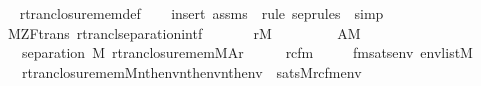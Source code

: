 \begin{isabellebody}
\ \ %
\endisadelimproof
%
\isatagproof
{}\isamarkupfalse%
\ rtran{\isacharunderscore}{\kern0pt}closure{\isacharunderscore}{\kern0pt}mem{\isacharunderscore}{\kern0pt}def\isanewline
\ \ \isamarkupfalse%
\ {\isacharparenleft}{\kern0pt}insert\ assms\ {\isacharsemicolon}{\kern0pt}\ {\isacharparenleft}{\kern0pt}rule\ sep{\isacharunderscore}{\kern0pt}rules\ {\isacharbar}{\kern0pt}\ simp{\isacharparenright}{\kern0pt}{\isacharplus}{\kern0pt}{\isacharparenright}{\kern0pt}%
\endisatagproof
{\isafoldproof}%
%
\isadelimproof
\isanewline
%
\endisadelimproof
\isanewline
\isanewline
{}\isamarkupfalse%
\ {\isacharparenleft}{\kern0pt}\ M{\isacharunderscore}{\kern0pt}ZF{\isacharunderscore}{\kern0pt}trans{\isacharparenright}{\kern0pt}\ rtrancl{\isacharunderscore}{\kern0pt}separation{\isacharunderscore}{\kern0pt}intf{\isacharcolon}{\kern0pt}\isanewline
\ \ \isanewline
\ \ \ \ {\isachardoublequoteopen}r{\isasymin}M{\isachardoublequoteclose}\isanewline
\ \ \ \ \isanewline
\ \ \ \ {\isachardoublequoteopen}A{\isasymin}M{\isachardoublequoteclose}\isanewline
\ \ \isanewline
\ \ \ \ {\isachardoublequoteopen}separation\ {\isacharparenleft}{\kern0pt}{\isacharhash}{\kern0pt}{\isacharhash}{\kern0pt}M{\isacharcomma}{\kern0pt}\ rtran{\isacharunderscore}{\kern0pt}closure{\isacharunderscore}{\kern0pt}mem{\isacharparenleft}{\kern0pt}{\isacharhash}{\kern0pt}{\isacharhash}{\kern0pt}M{\isacharcomma}{\kern0pt}A{\isacharcomma}{\kern0pt}r{\isacharparenright}{\kern0pt}{\isacharparenright}{\kern0pt}{\isachardoublequoteclose}\isanewline
%
\isadelimproof
%
\endisadelimproof
%
\isatagproof
{}\isamarkupfalse%
\ {\isacharminus}{\kern0pt}\isanewline
\ \ \isamarkupfalse%
\ rcfm\ \isanewline
\ \ \ \ fmsats{\isacharcolon}{\kern0pt}{\isachardoublequoteopen}{\isasymAnd}env{\isachardot}{\kern0pt}\ env{\isasymin}list{\isacharparenleft}{\kern0pt}M{\isacharparenright}{\kern0pt}\ {\isasymLongrightarrow}\isanewline
\ \ \ \ {\isacharparenleft}{\kern0pt}rtran{\isacharunderscore}{\kern0pt}closure{\isacharunderscore}{\kern0pt}mem{\isacharparenleft}{\kern0pt}{\isacharhash}{\kern0pt}{\isacharhash}{\kern0pt}M{\isacharcomma}{\kern0pt}nth{\isacharparenleft}{\kern0pt}{}{\isacharcomma}{\kern0pt}env{\isacharparenright}{\kern0pt}{\isacharcomma}{\kern0pt}nth{\isacharparenleft}{\kern0pt}{}{\isacharcomma}{\kern0pt}env{\isacharparenright}{\kern0pt}{\isacharcomma}{\kern0pt}nth{\isacharparenleft}{\kern0pt}{}{\isacharcomma}{\kern0pt}env{\isacharparenright}{\kern0pt}{\isacharparenright}{\kern0pt}{\isacharparenright}{\kern0pt}\ {\isasymlongleftrightarrow}\ sats{\isacharparenleft}{\kern0pt}M{\isacharcomma}{\kern0pt}rcfm{\isacharparenleft}{\kern0pt}{}{\isacharcomma}{\kern0pt}{}{\isacharcomma}{\kern0pt}{}{\isacharparenright}{\kern0pt}{\isacharcomma}{\kern0pt}env{\isacharparenright}{\kern0pt}{\isachardoublequoteclose}\isanewline

\end{isabellebody}
